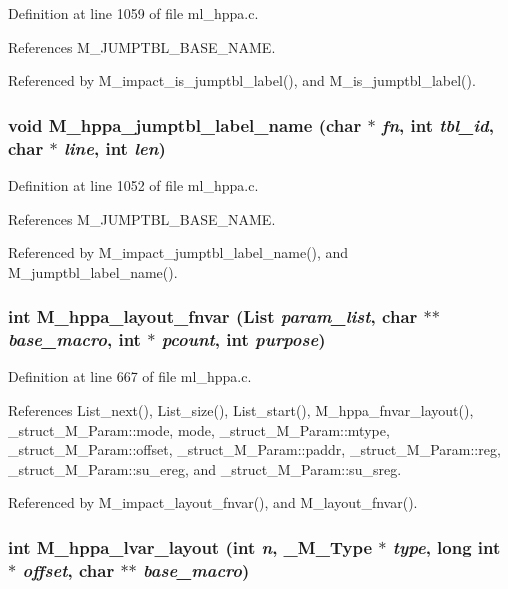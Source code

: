 Definition at line 1059 of file ml\_\-hppa.c.

References M\_\-JUMPTBL\_\-BASE\_\-NAME.

Referenced by M\_\-impact\_\-is\_\-jumptbl\_\-label(), and M\_\-is\_\-jumptbl\_\-label().
\subsubsection{\setlength{\rightskip}{0pt plus 5cm}void M\_\-hppa\_\-jumptbl\_\-label\_\-name (char $\ast$ {\em fn}, int {\em tbl\_\-id}, char $\ast$ {\em line}, int {\em len})}\label{ml__hppa_8c_a762a696b15fa48d0a3927f99880608e}




Definition at line 1052 of file ml\_\-hppa.c.

References M\_\-JUMPTBL\_\-BASE\_\-NAME.

Referenced by M\_\-impact\_\-jumptbl\_\-label\_\-name(), and M\_\-jumptbl\_\-label\_\-name().
\subsubsection{\setlength{\rightskip}{0pt plus 5cm}int M\_\-hppa\_\-layout\_\-fnvar (\bf{List} {\em param\_\-list}, char $\ast$$\ast$ {\em base\_\-macro}, int $\ast$ {\em pcount}, int {\em purpose})}\label{ml__hppa_8c_e899f68524e3ef5c4013a8a6bd6d434d}




Definition at line 667 of file ml\_\-hppa.c.

References List\_\-next(), List\_\-size(), List\_\-start(), M\_\-hppa\_\-fnvar\_\-layout(), \_\-struct\_\-M\_\-Param::mode, mode, \_\-struct\_\-M\_\-Param::mtype, \_\-struct\_\-M\_\-Param::offset, \_\-struct\_\-M\_\-Param::paddr, \_\-struct\_\-M\_\-Param::reg, \_\-struct\_\-M\_\-Param::su\_\-ereg, and \_\-struct\_\-M\_\-Param::su\_\-sreg.

Referenced by M\_\-impact\_\-layout\_\-fnvar(), and M\_\-layout\_\-fnvar().
\subsubsection{\setlength{\rightskip}{0pt plus 5cm}int M\_\-hppa\_\-lvar\_\-layout (int {\em n}, \bf{\_\-M\_\-Type} $\ast$ {\em type}, long int $\ast$ {\em offset}, char $\ast$$\ast$ {\em base\_\-macro})}\label{ml__hppa_8c_0a0da56cc84f57410199e37f0a5f7628}




